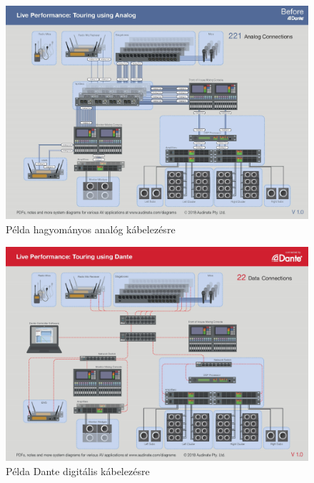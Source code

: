\begin{figure}[H]
	\centering
	\includegraphics[width=\linewidth, keepaspectratio]{figures/live-analog.jpg}
	\caption{Példa hagyományos analóg kábelezésre \cite{APPLICATIONDIAGRAMSFORDANTESYSTEMS}}\label{fig:live-analog}
\end{figure}
\begin{figure}[H]
	\centering
	\includegraphics[width=\linewidth, keepaspectratio]{figures/live-dante.jpg}
	\caption{Példa Dante digitális kábelezésre \cite{APPLICATIONDIAGRAMSFORDANTESYSTEMS}}\label{fig:live-dante}
\end{figure}

